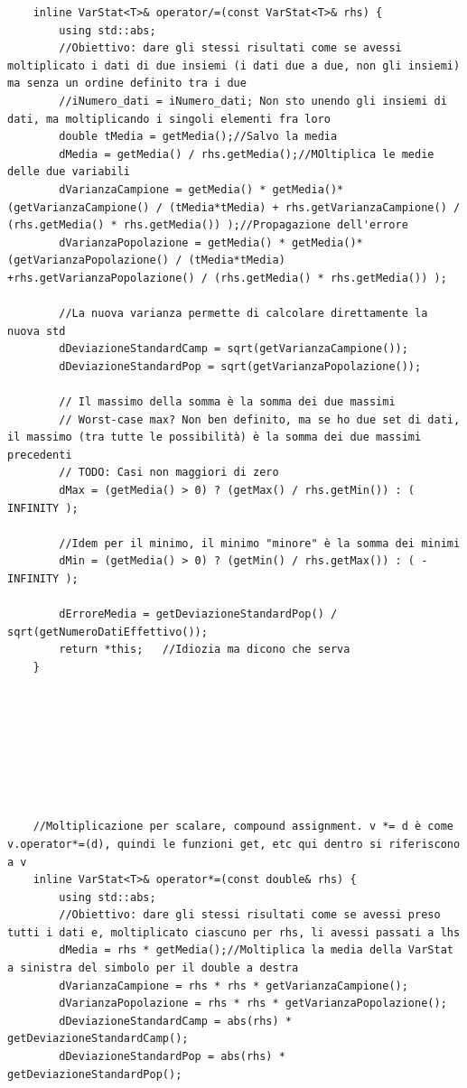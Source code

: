 \documentclass[12pt]{article} %
\begin{document}
\begin{verbatim}
	inline VarStat<T>& operator/=(const VarStat<T>& rhs) {
		using std::abs;
		//Obiettivo: dare gli stessi risultati come se avessi moltiplicato i dati di due insiemi (i dati due a due, non gli insiemi) ma senza un ordine definito tra i due
		//iNumero_dati = iNumero_dati; Non sto unendo gli insiemi di dati, ma moltiplicando i singoli elementi fra loro
		double tMedia = getMedia();//Salvo la media
		dMedia = getMedia() / rhs.getMedia();//MOltiplica le medie delle due variabili
		dVarianzaCampione = getMedia() * getMedia()*(getVarianzaCampione() / (tMedia*tMedia) + rhs.getVarianzaCampione() / (rhs.getMedia() * rhs.getMedia()) );//Propagazione dell'errore
		dVarianzaPopolazione = getMedia() * getMedia()*(getVarianzaPopolazione() / (tMedia*tMedia) +rhs.getVarianzaPopolazione() / (rhs.getMedia() * rhs.getMedia()) );

		//La nuova varianza permette di calcolare direttamente la nuova std
		dDeviazioneStandardCamp = sqrt(getVarianzaCampione());
		dDeviazioneStandardPop = sqrt(getVarianzaPopolazione());

		// Il massimo della somma è la somma dei due massimi
		// Worst-case max? Non ben definito, ma se ho due set di dati, il massimo (tra tutte le possibilità) è la somma dei due massimi precedenti
		// TODO: Casi non maggiori di zero
		dMax = (getMedia() > 0) ? (getMax() / rhs.getMin()) : ( INFINITY );

		//Idem per il minimo, il minimo "minore" è la somma dei minimi
		dMin = (getMedia() > 0) ? (getMin() / rhs.getMax()) : ( -INFINITY );

		dErroreMedia = getDeviazioneStandardPop() / sqrt(getNumeroDatiEffettivo());
		return *this;	//Idiozia ma dicono che serva
	}








	//Moltiplicazione per scalare, compound assignment. v *= d è come v.operator*=(d), quindi le funzioni get, etc qui dentro si riferiscono a v
	inline VarStat<T>& operator*=(const double& rhs) {
		using std::abs;
		//Obiettivo: dare gli stessi risultati come se avessi preso tutti i dati e, moltiplicato ciascuno per rhs, li avessi passati a lhs
		dMedia = rhs * getMedia();//Moltiplica la media della VarStat a sinistra del simbolo per il double a destra
		dVarianzaCampione = rhs * rhs * getVarianzaCampione();
		dVarianzaPopolazione = rhs * rhs * getVarianzaPopolazione();
		dDeviazioneStandardCamp = abs(rhs) * getDeviazioneStandardCamp();
		dDeviazioneStandardPop = abs(rhs) * getDeviazioneStandardPop();


\end{verbatim}
\end{document}
